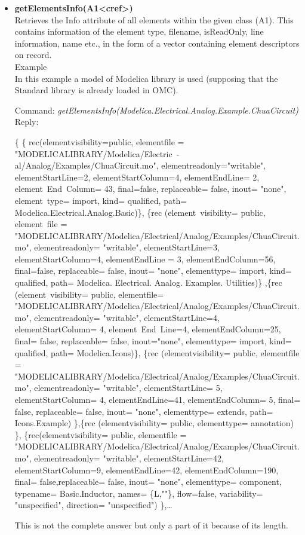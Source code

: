 \documentclass[11pt,a4paper,oneside,english]{book}
\newenvironment{modelicaExamples}{\begin{itemize}}{\end{itemize}}
\newcommand{\api}[2]{\item \textbf{#1} \\ #2}
\newcommand{\command}[1]{Command: \textit{#1}\\}
\newcommand{\reply}[1]{Reply: #1}
\newcommand{\functionex}[2]{\begin{singlespace} \command{#1} \reply{#2} \end{singlespace}}
\newcommand{\examples}{Example}
\begin{document}
\begin{modelicaExamples}
		\api{getElementsInfo(A1<cref>)}{Retrieves the Info attribute of all elements within the given class (A1). 
This contains information of the element type, filename, isReadOnly, line information, name etc., in the form of a
 vector containing element de\-scrip\-tors on re\-cord.\\
 \examples \\
		In this example a model of Modelica library is used (supposing that the Standard library is already loaded
 in OMC).
		\functionex{getElementsInfo(Modelica.Electrical.Analog.Example.ChuaCir\-cuit)}
		{ 
\begin{scriptsize} \{ \{ rec(elementvisibility=public, elementfile = "MODELICALIBRARY/Modelica/Electric\
-al/Analog/Examples/ChuaCircuit.mo", elementreadonly="writable", elementStartLine=2, elementStartColumn=4,
 elementEndLine= 2, element~End~Column= 43, final=false, replaceable= false, inout= "no\-ne", element~type= import,
 kind= qualified, path= Modelica.Electrical.Analog.Basic)\}, \{rec (element~visibility= public, element~file =
 "MODELICALIBRARY/Modelica/Electrical/Analog/Examples/ChuaCir\-cuit.mo", elementreadonly= "writable",
 elementStartLine=3, elementStartColumn=4, elementEndLine = 3, elementEndColumn=56, final=false, replaceable= false,
 inout= "none", elementtype= import, kind= qualified, path= Modelica. Electrical. Analog. Examples. Utilities)\}
,\{rec (element~visibility= public, elementfile=
 "MODELICALIBRARY/Mo\-delica/Electrical/Analog/Examples/ChuaCircuit.mo", elementreadonly= "writable", 
elementStartLine=4, elementStartColumn= 4, element~End~Line=4, elementEndColumn=25, final= false, replaceable= 
false, inout="none", elementtype= import, kind= qualified, path= Modelica.Icons)\}, \{rec (e\-le\-ment\-vi\-si\-bi\-li\-ty= 
public, elementfile = "MO\-DE\-LI\-CA\-LI\-BRA\-RY/Mo\-de\-li\-ca/E\-lectrical/A\-nalog/\-Examples/\-Chua\-Circuit.mo",  element\-read\-only=
 "wri\-ta\-ble",  e\-le\-ment\-Start\-Li\-ne= 5, e\-le\-me\-nt\-Start\-Co\-lumn= 4, e\-le\-me\-nt\-End\-Line=41, e\-le\-ment\-End\-Co\-lumn= 5, fi\-nal= fal\-se,
 replaceable= false, inout= "none", elementtype= extends, path= Icons.Example) \},\{rec (element\-visibility= public,
 element\-type= annotation) \}, \{rec(elementvisibility= public, elementfile =
 "MODELICALIBRARY/M\-odelica/E\-lectrical/A\-nalog/\-Examples/\-ChuaCircuit.mo", element\-read\-only= "wri\-ta\-ble",
 elementStartLine=42, elementStartColumn=9, elementEndLine=42, elementEndColumn=190, final= false,replaceable=
 fal\-se, inout= "none", elementtype= component, typename= Basic.Inductor, names= \{L,""\}, flow=false, variability= 
"unspecified", direction= "unspecified") \},\dots
		\end{scriptsize} }
This is not the complete answer but only a part of it because of its length.}
		

\end{modelicaExamples}
\end{document}
